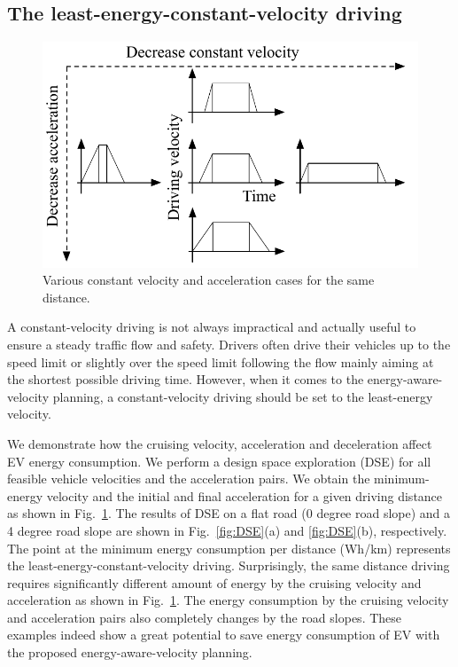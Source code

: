 \documentclass{IEEEtran}
\begin{document}
\subsection{The least-energy-constant-velocity driving} \label{subsec:constant drive}

\begin{figure} %
\centering
\includegraphics[width=0.9\hsize]{Figures/const_vel_drive_problem.pdf}
\caption{Various constant velocity and acceleration cases for the same distance.}
\label{fig:const_vel_drive_problem}
\end{figure} 

A constant-velocity driving is not always impractical and actually  useful to ensure a steady traffic flow and safety. Drivers often drive their vehicles up to the speed limit or slightly over the speed limit following the flow mainly aiming at the shortest possible driving time. However, when it comes to the energy-aware-velocity planning, a constant-velocity driving should be set to the least-energy velocity. 

We demonstrate how the cruising velocity, acceleration and deceleration affect EV energy consumption. We perform a design space exploration (DSE) for all feasible vehicle velocities and the acceleration pairs. We obtain the minimum-energy velocity and the initial and final acceleration for a given driving distance  as shown in Fig.~\ref{fig:const_vel_drive_problem}. The results of DSE on a flat road (0 degree road slope) and a 4 degree road slope are shown in Fig.~\ref{fig:DSE}(a) and \ref{fig:DSE}(b), respectively. The point at the minimum energy consumption per distance (Wh/km) represents the least-energy-constant-velocity driving. Surprisingly, the same distance driving requires significantly different amount of energy by the cruising velocity and acceleration as shown in Fig.~\ref{fig:const_vel_drive_problem}. The energy consumption by the cruising velocity and acceleration pairs also completely changes by the road slopes. These examples indeed show a great potential to save energy consumption of EV with the proposed energy-aware-velocity planning.
\end{document}
